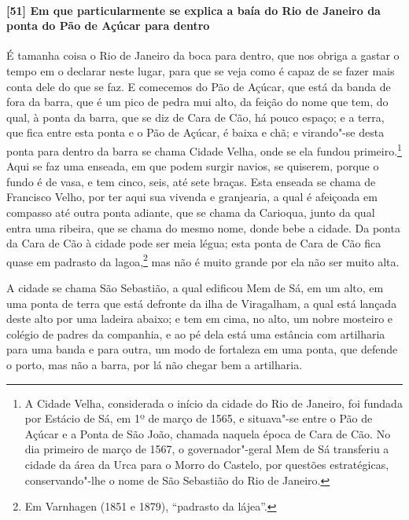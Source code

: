 \paragraph{[51] Em que particularmente se explica a baía do Rio de Janeiro da ponta do Pão
de Açúcar para dentro} \quad
É tamanha coisa o Rio de Janeiro da boca para dentro, que nos obriga a gastar o tempo em o
declarar neste lugar, para que se veja como é capaz de se fazer mais conta dele do que se
faz. E comecemos do Pão de Açúcar, que está da banda de fora da barra, que é um pico de
pedra mui alto, da feição do nome que tem, do qual, à ponta da barra, que se diz de Cara
de Cão, há pouco espaço; e a terra, que fica entre esta ponta e o Pão de Açúcar, é baixa e
chã; e virando"-se desta ponta para dentro da barra se chama Cidade Velha, onde se ela
fundou primeiro.\footnote{ A Cidade Velha, considerada o início da cidade do Rio de
Janeiro, foi fundada por Estácio de Sá, em 1º de março de 1565, e situava"-se entre o Pão
de Açúcar e a Ponta de São João, chamada naquela época de Cara de Cão. No dia primeiro de
março de 1567, o governador"-geral Mem de Sá transferiu a cidade da área da Urca para o
Morro do Castelo, por questões estratégicas, conservando"-lhe o nome de São Sebastião do
Rio de Janeiro.} Aqui se faz uma enseada, em que podem surgir navios, se quiserem, porque
o fundo é de vasa, e tem cinco, seis, até sete braças. Esta enseada se chama de Francisco
Velho, por ter aqui sua vivenda e granjearia, a qual é afeiçoada em compasso até outra
ponta adiante, que se chama da Carioqua, junto da qual entra uma ribeira, que se chama do
mesmo nome, donde bebe a cidade. Da ponta da Cara de Cão à cidade pode ser meia légua;
esta ponta de Cara de Cão fica quase em padrasto da lagoa,\footnote{ Em Varnhagen (1851 e
1879), ``padrasto da lájea''.} mas não é muito grande por ela não ser muito alta.

A cidade se chama São Sebastião, a qual edificou Mem de Sá, em um alto, em uma ponta de
terra que está defronte da ilha de Viragalham, a qual está lançada deste alto por uma
ladeira abaixo; e tem em cima, no alto, um nobre mosteiro e colégio de padres da
companhia, e ao pé dela está uma estância com artilharia para uma banda e para outra, um
modo de fortaleza em uma ponta, que defende o porto, mas não a barra, por lá não chegar
bem a artilharia.

